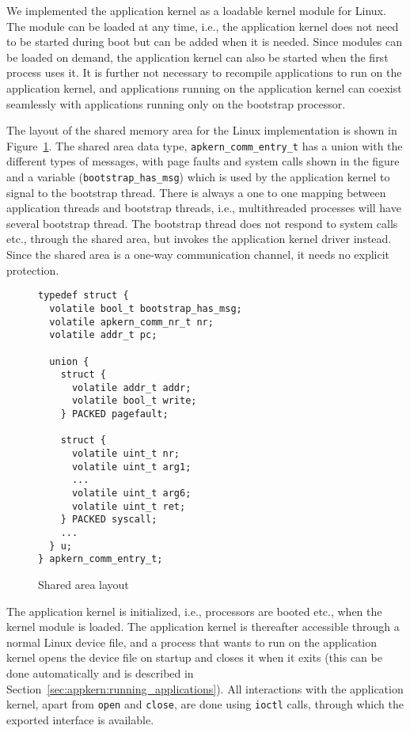 \label{sec:appkern:implementation}

We implemented the application kernel as a loadable kernel module for Linux.
The module can be loaded at any time, i.e., the application kernel does not
need to be started during boot but can be added when it is needed. Since
modules can be loaded on demand, the application kernel can also be started
when the first process uses it. It is further not necessary to recompile
applications to run on the application kernel, and applications running on the
application kernel can coexist seamlessly with applications running only on
the bootstrap processor.

\label{fix:shared_area}The layout of the shared memory area for the Linux
implementation is shown in Figure~\ref{fig:shared_area}. The shared area data
type, \texttt{apkern\_comm\_entry\_t} has a union with the different types of
messages, with page faults and system calls shown in the figure and a variable
(\texttt{bootstrap\_has\_msg}) which is used by the application kernel to
signal to the bootstrap thread. There is always a one to one mapping between
application threads and bootstrap threads, i.e., multithreaded processes will
have several bootstrap thread. The bootstrap thread does not respond to system
calls etc., through the shared area, but invokes the application kernel driver
instead. Since the shared area is a one-way communication channel, it needs no
explicit protection.

\begin{figure}
  \footnotesize
  \begin{verbatim}
typedef struct {
  volatile bool_t bootstrap_has_msg;
  volatile apkern_comm_nr_t nr;
  volatile addr_t pc;

  union {
    struct {
      volatile addr_t addr;
      volatile bool_t write;
    } PACKED pagefault;

    struct {
      volatile uint_t nr;
      volatile uint_t arg1;
      ...
      volatile uint_t arg6;
      volatile uint_t ret;
    } PACKED syscall;
    ...
  } u;
} apkern_comm_entry_t;
  \end{verbatim}
  \caption{Shared area layout}
  \label{fig:shared_area}
\end{figure}

The application kernel is initialized, i.e., processors are booted etc., when
the kernel module is loaded. The application kernel is thereafter accessible
through a normal Linux device file, and a process that wants to run on the
application kernel opens the device file on startup and closes it when it
exits (this can be done automatically and is described in
\label{fix:forward_ref}Section~\ref{sec:appkern:running_applications}).  All interactions with the
application kernel, apart from \texttt{open} and \texttt{close}, are done
using \texttt{ioctl} calls, through which the exported interface is available.

